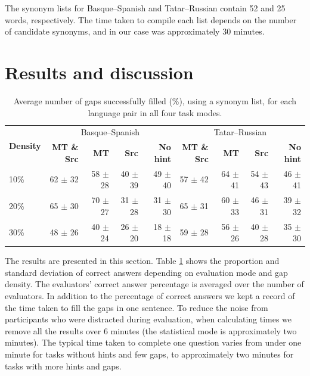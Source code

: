 \documentclass[11pt]{article}
\begin{document}
The synonym lists for Basque--Spanish and Tatar--Russian contain 52 and 25 words, respectively. The time taken to compile each list depends on the number of candidate synonyms, and in our case was approximately 30 minutes. 

\section{Results and discussion}
\label{sec:results}
\begin{table}
\centering
  \begin{tabular}{|l|r|r|r|r|r|r|r|r|}
  \hline
 \multirow{2}{*}{\textbf{Density}} & \multicolumn{4}{|c|}{Basque--Spanish} & \multicolumn{4}{|c|}{Tatar--Russian} 
\\\cline{2-9}
                                            & \textbf{MT \& Src} & \textbf{MT} & \textbf{Src} & \textbf{No hint}& \textbf{MT \& Src} & \textbf{MT} & \textbf{Src} & \textbf{No hint} 
\\
\hline
10\%&62 \(\pm\) 32&58 \(\pm\) 28&40 \(\pm\) 39&49 \(\pm\) 40
&57 \(\pm\) 42&64 \(\pm\) 41&54 \(\pm\) 43&46 \(\pm\) 41\\
20\%&65 \(\pm\) 30&70 \(\pm\) 27&31 \(\pm\) 28&31 \(\pm\) 30
&65 \(\pm\) 31&60 \(\pm\) 33&46 \(\pm\) 31&39 \(\pm\) 32\\
30\%&48 \(\pm\) 26&40 \(\pm\) 24&26 \(\pm\) 20&18 \(\pm\) 18
&59 \(\pm\) 28&56 \(\pm\) 26&40 \(\pm\) 28&35 \(\pm\) 30\\
\hline
\end{tabular}
\caption{Average number of gaps successfully filled (\%), using a synonym list, for each language pair in all four task modes.} 
\label{table:res}
\end{table}

The results are presented in this section. Table \ref{table:res} 
shows
the proportion and standard deviation of correct answers depending on evaluation mode and gap density.
The evaluators' correct answer percentage is averaged over the number of evaluators. In addition to the percentage of correct answers we kept a record of the time taken to fill the gaps in one sentence. To reduce the noise from participants who were distracted during evaluation, when
calculating times we remove all the results over 6 minutes (the statistical mode is approximately
two minutes). The typical time taken to complete one question varies from under one minute for tasks without hints and few gaps, to approximately two minutes for tasks with more hints and gaps. 
\end{document}
